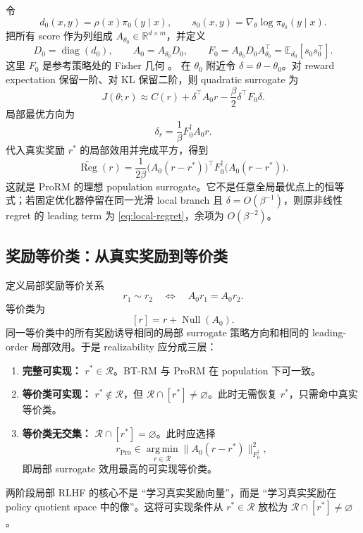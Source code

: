 \documentclass[UTF8,11pt,a4paper,fontset=none]{ctexart}
\newcommand{\R}{\mathbb{R}}
\newcommand{\E}{\mathbb{E}}
\newcommand{\Reg}{\operatorname{Reg}}
\newcommand{\Null}{\operatorname{Null}}
\newcommand{\diag}{\operatorname{diag}}
\newcommand{\argmin}{\operatorname*{arg\,min}}
\begin{document}
令
\[
d_0(x,y)=\rho(x)\pi_0(y\mid x),\qquad
s_0(x,y)=\nabla_\theta\log\pi_{\theta_0}(y\mid x).
\]
把所有 score 作为列组成 $A_{\theta_0}\in\R^{d\times m}$，并定义
\[
D_0=\diag(d_0),\qquad A_0=A_{\theta_0}D_0,
\qquad F_0=A_{\theta_0}D_0A_{\theta_0}^{\top}=\E_{d_0}[s_0s_0^\top].
\]
这里 $F_0$ 是参考策略处的 Fisher 几何 \cite{amari}。
在 $\theta_0$ 附近令 $\delta=\theta-\theta_0$。对 reward expectation 保留一阶、对 KL 保留二阶，则 quadratic surrogate 为
\[
J(\theta;r)\approx C(r)+\delta^\top A_0r-\frac{\beta}{2}\delta^\top F_0\delta.
\]
局部最优方向为
\[
\boxed{\delta_r=\frac1\beta F_0^\dagger A_0r.}
\]
代入真实奖励 $r^*$ 的局部效用并完成平方，得到
\begin{equation}
\boxed{
\widetilde{\Reg}(r)=\frac{1}{2\beta}
\bigl(A_0(r-r^*)\bigr)^\top F_0^\dagger
\bigl(A_0(r-r^*)\bigr).
}
\label{eq:local-regret}
\end{equation}
这就是 ProRM 的理想 population surrogate。它不是任意全局最优点上的恒等式；若固定优化器停留在同一光滑 local branch 且 $\delta=O(\beta^{-1})$，则原非线性 regret 的 leading term 为 \cref{eq:local-regret}，余项为 $O(\beta^{-2})$。

\subsection{奖励等价类：从真实奖励到等价类}

定义局部奖励等价关系
\[
r_1\sim r_2\quad\Longleftrightarrow\quad A_0r_1=A_0r_2.
\]
等价类为
\[
[r]=r+\Null(A_0).
\]
同一等价类中的所有奖励诱导相同的局部 surrogate 策略方向和相同的 leading-order 局部效用。于是 realizability 应分成三层：
\begin{enumerate}
\item \textbf{完整可实现：} $r^*\in\mathcal R$。BT-RM 与 ProRM 在 population 下可一致。
\item \textbf{等价类可实现：} $r^*\notin\mathcal R$，但 $\mathcal R\cap[r^*]\neq\varnothing$。此时无需恢复 $r^*$，只需命中真实等价类。
\item \textbf{等价类无交集：} $\mathcal R\cap[r^*]=\varnothing$。此时应选择
\[
r_{\mathrm{Pro}}\in\argmin_{r\in\mathcal R}\|A_0(r-r^*)\|_{F_0^\dagger}^2,
\]
即局部 surrogate 效用最高的可实现等价类。
\end{enumerate}

\begin{claimbox}[命题：局部奖励等价类]
两阶段局部 RLHF 的核心不是 ``学习真实奖励向量''，而是 ``学习真实奖励在 policy quotient space 中的像''。这将可实现条件从 $r^*\in\mathcal R$ 放松为 $\mathcal R\cap[r^*]\neq\varnothing$。
\end{claimbox}
\end{document}
